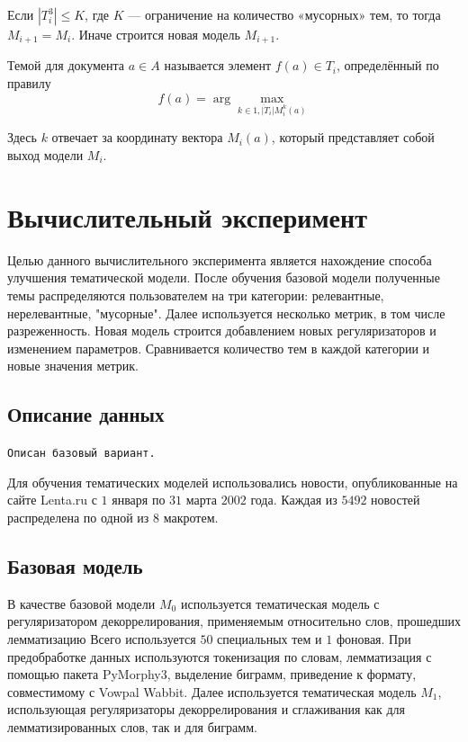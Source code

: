 \documentclass{article}
\begin{document}
Если $\left| T_i^3 \right| \leq K$, где $K$ — ограничение на количество «мусорных» тем, то тогда $M_{i + 1} = M_i$. Иначе строится новая модель $M_{i + 1}$.

Темой для документа $a \in A$ называется элемент $f(a) \in T_i$, определённый по правилу $$f(a) = \arg \max \limits_{k \in  \overline{1, |T_i|} M_i^k (a)}$$

Здесь $k$ отвечает за координату вектора $M_i (a)$, который представляет собой выход модели $M_i$.

\section{Вычислительный эксперимент}

Целью данного вычислительного эксперимента является нахождение способа улучшения тематической модели.
После обучения базовой модели полученные темы распределяются пользователем на три категории: релевантные, нерелевантные, "мусорные".
Далее используется несколько метрик, в том числе разреженность.
Новая модель строится добавлением новых регуляризаторов и изменением параметров.
Сравнивается количество тем в каждой категории и новые значения метрик.

\subsection{Описание данных}

\texttt{Описан базовый вариант.}

Для обучения тематических моделей использовались новости, опубликованные на сайте Lenta.ru с $1$ января по $31$ марта $2002$ года.
Каждая из $5492$ новостей распределена по одной из $8$ макротем.

\subsection{Базовая модель}

В качестве базовой модели $M_0$ используется тематическая модель с регуляризатором декоррелирования, применяемым относительно слов, прошедших лемматизацию
Всего используется $50$ специальных тем и $1$ фоновая. При предобработке данных используются токенизация по словам, лемматизация с помощью пакета PyMorphy3, выделение биграмм, приведение к формату, совместимому с Vowpal Wabbit.
Далее используется тематическая модель $M_1$, использующая регуляризаторы декоррелирования и сглаживания как для лемматизированных слов, так и для биграмм.
\end{document}

